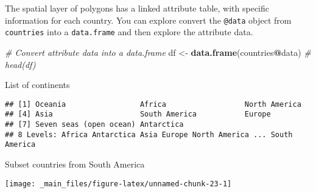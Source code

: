\documentclass[]{book}
\newenvironment{Shaded}{\begin{snugshade}}{\end{snugshade}}
\newcommand{\CommentTok}[1]{\textcolor[rgb]{0.56,0.35,0.01}{\textit{#1}}}
\newcommand{\DataTypeTok}[1]{\textcolor[rgb]{0.13,0.29,0.53}{#1}}
\newcommand{\DecValTok}[1]{\textcolor[rgb]{0.00,0.00,0.81}{#1}}
\newcommand{\KeywordTok}[1]{\textcolor[rgb]{0.13,0.29,0.53}{\textbf{#1}}}
\newcommand{\NormalTok}[1]{#1}
\newcommand{\OperatorTok}[1]{\textcolor[rgb]{0.81,0.36,0.00}{\textbf{#1}}}
\newcommand{\StringTok}[1]{\textcolor[rgb]{0.31,0.60,0.02}{#1}}
\begin{document}
The spatial layer of polygons has a linked attribute table, with specific information for each country. You can explore convert the \texttt{@data} object from \texttt{countries} into a \texttt{data.frame} and then explore the attribute data.

\begin{Shaded}
\begin{Highlighting}[]
\CommentTok{# Convert attribute data into a data.frame}
\NormalTok{df <-}\StringTok{ }\KeywordTok{data.frame}\NormalTok{(countries}\OperatorTok{@}\NormalTok{data)}
\CommentTok{# head(df)}
\end{Highlighting}
\end{Shaded}

List of continents

\begin{Shaded}
\end{Shaded}

\begin{verbatim}
## [1] Oceania                 Africa                  North America          
## [4] Asia                    South America           Europe                 
## [7] Seven seas (open ocean) Antarctica             
## 8 Levels: Africa Antarctica Asia Europe North America ... South America
\end{verbatim}

Subset countries from South America

\begin{Shaded}
\end{Shaded}

\begin{center}\texttt{[image: \_main\_files/figure-latex/unnamed-chunk-23-1]} \end{center}
\end{document}
